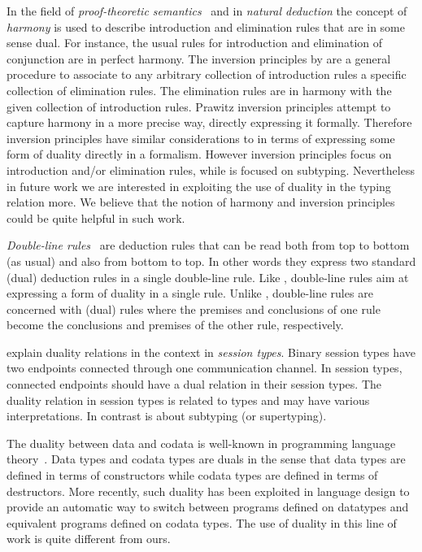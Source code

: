 In the field of \emph{proof-theoretic semantics}~\citep{gentzen:untersuchungen}
and in \emph{natural deduction}
the concept of \emph{harmony} is used to describe introduction and
elimination rules that are in some sense dual. For instance, the usual
rules for introduction and elimination of conjunction are in perfect harmony.
The inversion principles by \cite{Prawitz1979ProofsAT}
are a general procedure to associate to any
arbitrary collection of introduction rules a specific collection of
elimination rules. The elimination rules are in harmony with the given collection of
introduction rules. Prawitz inversion principles attempt to capture harmony
in a more precise way, directly expressing it formally.
Therefore inversion principles have similar considerations to \nameduo in terms
of expressing some form of duality directly in a formalism. However
inversion principles focus on introduction and/or elimination rules,
while \nameduo is focused on subtyping. Nevertheless in future work we
are interested in exploiting the use of duality in the typing relation more.
We believe that the notion of harmony and inversion principles could be
quite helpful in such work.

\emph{Double-line rules}~\citep{dosen1989} are deduction rules that
can be read both from top to bottom (as usual) and
also from bottom to top. In other words they express
two standard (dual) deduction rules in a single double-line rule.
Like \nameduo, double-line rules aim at expressing a form of duality
in a single rule. Unlike \nameduo, double-line rules are concerned
with (dual) rules where the premises and conclusions of one rule
become the conclusions and premises of the other rule, respectively.

\cite{bernardi2014duality} explain duality relations in the
context in \emph{session types}.  Binary session types have two
endpoints connected through one communication channel.
In session types, connected endpoints should have a
dual relation in their session types. The duality relation in session
types is related to types and may have various
interpretations. In contrast \nameduo is about subtyping (or supertyping).

The duality between data and codata is well-known in programming
language theory~\citep{BirddeMoor96:Algebra}. Data types and codata types are duals in the sense
that data types are defined in terms of constructors while codata
types are defined in terms of destructors.  More recently, such
duality has been exploited in language design
\citep{ostermann2018dualizing,binder2019decomposition} to provide an
automatic way to switch between programs defined on datatypes and equivalent
programs defined on codata types. 
The use of duality in this line of work is quite different from ours.


